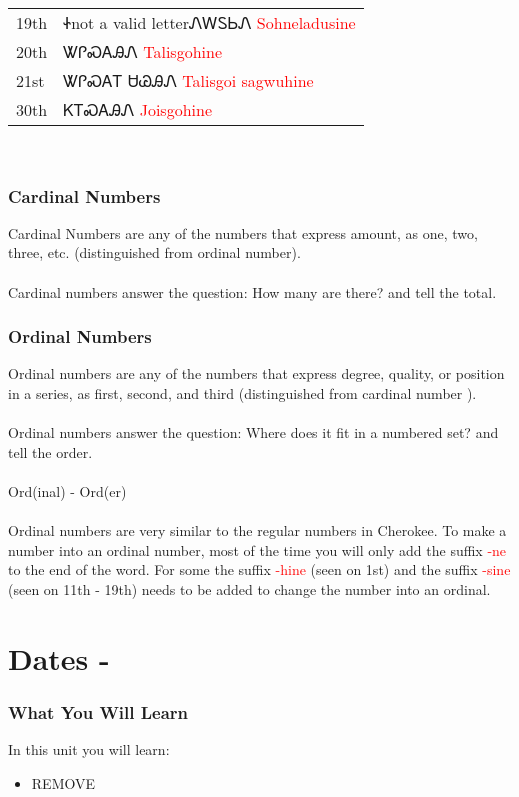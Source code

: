 \vfill\newpage\begin{minipage}{\linewidth}\begin{tabular}{p{3cm} p{11cm}}
19th & Ꮠnot a valid letterᏁᎳᏚᏏᏁ 
 \newline \textcolor{red}{Sohneladusine}\\
20th & ᏔᎵᏍᎪᎯᏁ 
 \newline \textcolor{red}{Talisgohine}\\
21st & ᏔᎵᏍᎪᎢ ᏌᏊᎯᏁ 
 \newline \textcolor{red}{Talisgoi sagwuhine}\\
30th & ᏦᎢᏍᎪᎯᏁ 
 \newline \textcolor{red}{Joisgohine}\\
\end{tabular}
\end{minipage}

\
\subsection{Cardinal Numbers}
Cardinal Numbers are any of the numbers that express amount, as one, two, three,  etc. (distinguished from ordinal number).\cite{cardinalNumbers}\\\\
Cardinal numbers answer the question: How many are there? and tell the total.\
\index{Ordinal Numbers}\subsection{Ordinal Numbers}
Ordinal numbers are any of the numbers that express degree, quality, or position in a series, as first, second, and third  (distinguished from cardinal number ).\cite{ordinalNumbers}\\\\
\noindent Ordinal numbers answer the question: Where does it fit in a numbered set? and tell the order.\\\\
\noindent Ord(inal) - Ord(er)\\\\
Ordinal numbers are very similar to the regular numbers in Cherokee. To make a number into an ordinal number, most of the time you will only add the suffix \textcolor{red}{-ne} to the end of the word. For some the suffix \textcolor{red}{-hine} (seen on 1st) and the suffix \textcolor{red}{-sine} (seen on 11th - 19th) needs to be added to change the number into an ordinal.\cite{walc141}
\index{}
\chapter{Dates - }
\subsection{What You Will Learn}
In this unit you will learn:
\begin{itemize}
\item REMOVE
\end{itemize}\newpage

